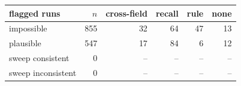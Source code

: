 \begin{tabular}{lrrrrr}
\toprule
flagged runs & $n$ & cross-field & recall & rule & none \\
\midrule
impossible & 855 & 32 & 64 & 47 & 13 \\
plausible & 547 & 17 & 84 & 6 & 12 \\
sweep consistent & 0 & – & – & – & – \\
sweep inconsistent & 0 & – & – & – & – \\
\bottomrule
\end{tabular}
